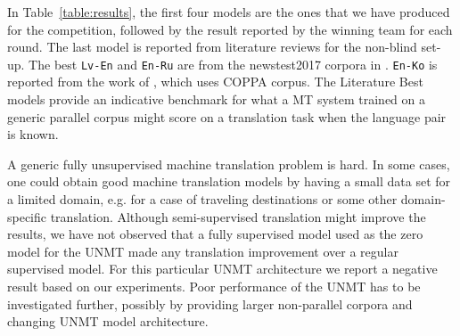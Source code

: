 \documentclass[]{article}
\begin{document}
In Table~\ref{table:results}, the first four models are the ones that we have produced for the competition, followed by the result reported by the winning team for each round.
The last model is reported from literature reviews for the non-blind set-up.
The best {\tt Lv-En} and  {\tt En-Ru} are from the newstest2017 corpora in \cite{bojar2017findings}.
{\tt En-Ko} is reported from the work of \cite{junczys2016coppa}, which uses COPPA corpus.
The Literature Best models provide an indicative benchmark for what a \ac{MT} system trained on a generic parallel corpus might score on a translation task when the language pair is known.

A generic fully unsupervised machine translation problem is hard.
In some cases, one could obtain good machine translation models by having a small data set for a limited domain, e.g. for a case of traveling destinations or some other domain-specific translation.
Although semi-supervised translation might improve the results, we have not observed that a fully supervised model used as the zero model for the \ac{UNMT} made any translation improvement over a regular supervised model.
For this particular \ac{UNMT} architecture we report a negative result based on our experiments.
Poor performance of the \ac{UNMT} has to be investigated further, possibly by providing larger non-parallel corpora and changing \ac{UNMT} model architecture.

\small



\end{document}
